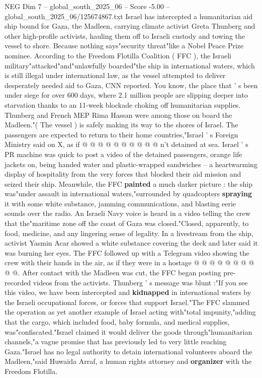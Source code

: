 \begin{textsample}{NEG Dim 7 – global\_south\_2025\_06 – Score -5.00 – global\_south\_2025\_06/125674867.txt}  \label{ex:f7_neg_277}
Israel has intercepted a humanitarian aid ship bound for Gaza, the Madleen, carrying climate activist Greta Thunberg and other high-profile activists, hauling them off to Israeli custody and towing the vessel to shore.
Because nothing says"security threat"like a Nobel Peace Prize nominee.
According to the Freedom Flotilla Coalition ( FFC ), the Israeli military"attacked"and"unlawfully boarded"the ship in international waters, which is still illegal under international law, as the vessel attempted to deliver desperately needed aid to Gaza, CNN reported.
You know, the place that ' s been under siege for over 600 days, where 2.1 million people are slipping deeper into starvation thanks to an 11-week blockade choking off humanitarian supplies.
Thunberg and French MEP Rima Hassan were among those on board the Madleen."( The vessel ) is safely making its way to the shores of Israel.
The passengers are expected to return to their home countries,"Israel ' s Foreign Ministry said on X, as if @ @ @ @ @ @ @ @ @ @ n't detained at sea.
Israel ' s PR machine was quick to post a video of the detained passengers, orange life jackets on, being handed water and plastic-wrapped sandwiches -- a heartwarming display of hospitality from the very forces that blocked their aid mission and seized their ship.
Meanwhile, the FFC \textbf{painted} a much darker picture : the ship was"under assault in international waters,"surrounded by quadcopters \textbf{spraying} it with some white substance, jamming communications, and blasting eerie sounds over the radio.
An Israeli Navy voice is heard in a video telling the crew that the"maritime zone off the coast of Gaza was closed."Closed, apparently, to food, medicine, and any lingering sense of legality.
In a livestream from the ship, activist Yasmin Acar showed a white substance covering the deck and later said it was burning her eyes.
The FFC followed up with a Telegram video showing the crew with their hands in the air, as if they were in a hostage @ @ @ @ @ @ @ @ @ @.
After contact with the Madleen was cut, the FFC began posting pre-recorded videos from the activists.
Thunberg ' s message was blunt :"If you see this video, we have been intercepted and \textbf{kidnapped} in international waters by the Israeli occupational forces, or forces that support Israel."The FFC slammed the operation as yet another example of Israel acting with"total impunity,"adding that the cargo, which included food, baby formula, and medical supplies, was"confiscated."Israel claimed it would deliver the goods through"humanitarian channels,"a vague promise that has previously led to very little reaching Gaza."Israel has no legal authority to detain international volunteers aboard the Madleen,"said Huwaida Arraf, a human rights attorney and \textbf{organizer} with the Freedom Flotilla.

\end{textsample}
